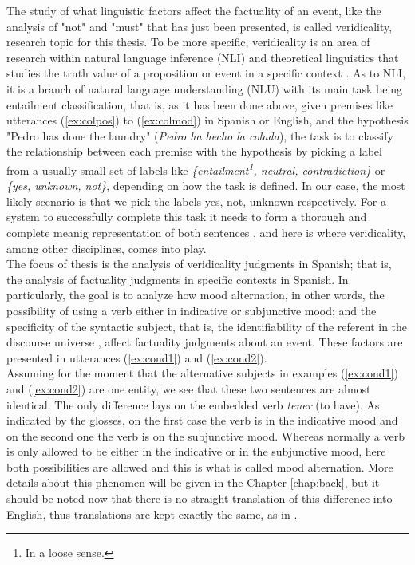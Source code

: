 The study of what linguistic factors affect the factuality of an event, like the analysis of "not" and "must" that has just been presented, is called veridicality, research topic for this thesis. To be more specific, veridicality is an area of research within natural language inference (NLI) and theoretical linguistics that studies the truth value of a proposition or event in a specific context \citep{giannakidou2014non,giannakidou2015mixed}. As to NLI, it is a branch of natural language understanding (NLU) with its main task being entailment classification, that is, as it has been done above, given premises like utterances (\ref{ex:colpos}) to (\ref{ex:colmod}) in Spanish or English, and the hypothesis "Pedro has done the laundry" (\textit{Pedro ha hecho la colada}), the task is to classify the relationship between each premise with the hypothesis by picking a label from a usually small set of labels like \textit{\{entailment\footnote{In a loose sense.}, neutral, contradiction\}} \citep{williams2017broad} or \textit{\{yes, unknown, not\}}, depending on how the task is defined. In our case, the most likely scenario is that we pick the labels yes, not, unknown respectively. For a system to successfully complete this task it needs to form a thorough and complete meanig representation of both sentences \citep{williams2017broad}, and here is where veridicality, among other disciplines, comes into play.\\ 

The focus of thesis is the analysis of veridicality judgments in Spanish; that is, the analysis of factuality judgments in specific contexts in Spanish. In particularly, the goal is to analyze how mood alternation, in other words, the possibility of using a verb either in indicative or subjunctive mood; and the specificity of the syntactic subject, that is, the identifiability of the referent in the discourse universe \citep{caudet1999expresiones}, affect factuality judgments about an event. These factors are presented in utterances (\ref{ex:cond1}) and (\ref{ex:cond2}).\\

Assuming for the moment that the alternative subjects in examples (\ref{ex:cond1}) and (\ref{ex:cond2}) are one entity, we see that these two sentences are almost identical. The only difference lays on the embedded verb \textit{tener} (to have). As indicated by the glosses, on the first case the verb is in the indicative mood and on the second one the verb is on the subjunctive mood. Whereas normally a verb is only allowed to be either in the indicative or in the subjunctive mood, here both possibilities are allowed and this is what is called mood alternation. More details about this phenomen will be given in the Chapter \ref{chap:back}, but it should be noted now that there is no straight translation of this difference into English, thus translations are kept exactly the same, as in \citet{faulkner2021systematic}.\\


